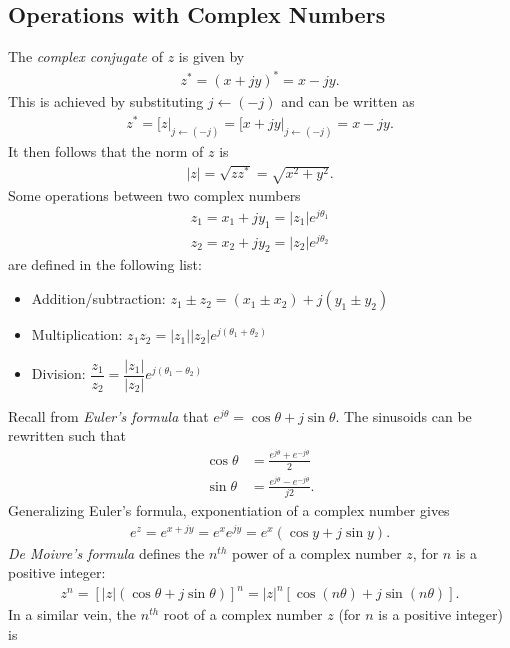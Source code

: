 \documentclass{report}
\begin{document}
\subsection*{Operations with Complex Numbers}
The \emph{complex conjugate} of $z$ is given by 
\begin{align}
    z^* = (x+jy)^* = x-jy.
\end{align}
This is achieved by substituting $j\leftarrow (-j)$ and can be written as 
\begin{align}
    z^* = \big[z\big|_{j\leftarrow (-j)} = \big[x+jy\big|_{j\leftarrow (-j)} = x-jy.
\end{align}
It then follows that the norm of $z$ is
\begin{align}
    |z| = \sqrt{zz^*} = \sqrt{x^2+y^2}.
\end{align}
Some operations between two complex numbers 
\begin{align*}
    z_1=x_1+jy_1=|z_1|e^{j\theta_1} \\
    z_2=x_2+jy_2=|z_2|e^{j\theta_2}
\end{align*}
are defined in the following list:
\begin{itemize}
    \item Addition/subtraction: $z_1 \pm z_2=(x_1\pm x_2) + j(y_1\pm y_2)$
    \item Multiplication: $z_1z_2=|z_1||z_2|e^{j(\theta_1+\theta_2)}$
    \item Division: $\dfrac{z_1}{z_2}=\dfrac{|z_1|}{|z_2|}e^{j(\theta_1-\theta_2)}$
\end{itemize}
Recall from \emph{Euler's formula} that $e^{j\theta} = \cos\theta + j\sin\theta$. The sinusoids can be rewritten such that
\begin{align}
    \cos\theta &= \frac{e^{j\theta}+e^{-j\theta}}{2} \\
    \sin\theta &= \frac{e^{j\theta}-e^{-j\theta}}{j2}.
\end{align}
Generalizing Euler's formula, exponentiation of a complex number gives
\begin{align}
    e^z = e^{x+jy} = e^x e^{jy} = e^x(\cos y +j\sin y).
\end{align}
\emph{De Moivre's formula} defines the $n^{th}$ power of a complex number $z$, for $n$ is a positive integer:
\begin{align}
    z^n = [|z|(\cos\theta + j\sin\theta)]^n = |z|^n[\cos(n\theta)+j\sin(n\theta)].
\end{align}
In a similar vein, the $n^{th}$ root of a complex number $z$ (for $n$ is a positive integer) is
\end{document}
